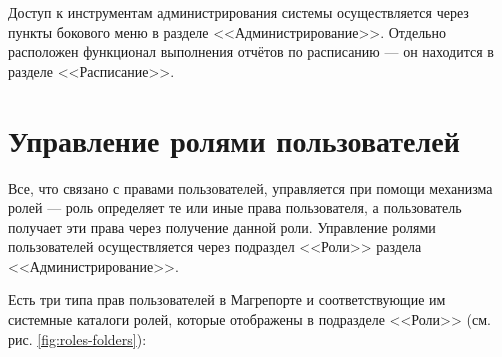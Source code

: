 \documentclass[../user-manual.tex]{subfiles}
\begin{document}
	
	Доступ к инструментам администрирования системы осуществляется через пункты бокового меню в разделе <<Администрирование>>. Отдельно расположен функционал выполнения отчётов по расписанию --- он находится в разделе <<Расписание>>.
	
	\section{Управление ролями пользователей}\label{administration:user-roles}
	
	Все, что связано с правами пользователей, управляется при помощи механизма ролей --- роль определяет те или иные права пользователя, а пользователь получает эти права через получение данной роли. Управление ролями пользователей осуществляется через подраздел <<Роли>> раздела <<Администрирование>>.
	
	Есть три типа прав пользователей в Магрепорте и соответствующие им системные каталоги ролей, которые отображены в подразделе <<Роли>> (см. рис. \ref{fig:roles-folders}):
	
\end{document}
